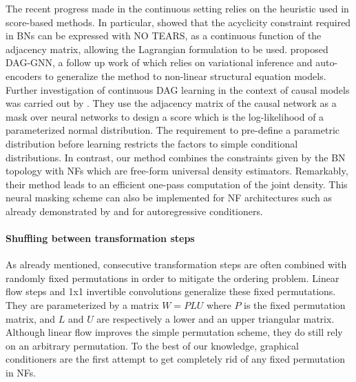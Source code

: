 The recent progress made in the continuous setting relies on the heuristic used in score-based methods. In particular, \citet{DAG-1} showed that the acyclicity constraint required in BNs can be expressed with NO TEARS, as a continuous function of the adjacency matrix, allowing the Lagrangian formulation to be used.
\citet{DAG-2} proposed DAG-GNN, a follow up work of \citet{DAG-1} which relies on variational inference and auto-encoders to generalize the method to non-linear structural equation models. Further investigation of continuous DAG learning in the context of causal models was carried out by \citet{DAG-3}. They use the adjacency matrix of the causal network as a mask over neural networks to design a score which is the log-likelihood of a parameterized normal distribution. The requirement to pre-define a parametric distribution before learning restricts the factors to simple conditional distributions. In contrast, our method combines the constraints given by the BN topology with  NFs which are free-form universal density estimators. Remarkably, their method leads to an efficient one-pass computation of the joint density. This neural masking scheme can also be implemented for NF architectures such as already demonstrated by \citet{MAF} and \citet{BNAF} for autoregressive conditioners.

\paragraph{Shuffling between transformation steps}
As already mentioned, consecutive transformation steps are often combined with randomly fixed permutations in order to mitigate the ordering problem. Linear flow steps \citep{TAN} and 1x1 invertible convolutions \citep{GLOW} generalize these fixed permutations. They are parameterized by a matrix $W = PLU$ where $P$ is the fixed permutation matrix, and $L$ and $U$ are respectively a lower and an upper triangular matrix. Although linear flow improves the simple permutation scheme, they do still rely on an arbitrary permutation. To the best of our knowledge, graphical conditioners are the first attempt to get completely rid of any fixed permutation in NFs.




